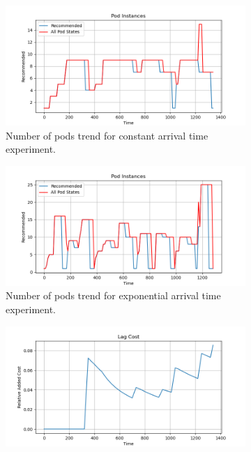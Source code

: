 \begin{figure}[H]
	\begin{subfigure}{0.49\linewidth}
	    \centering
	    \includegraphics[width=1\linewidth]{images/sliding_window/constant/pods.png}
	    \caption{Number of pods trend for constant arrival time experiment.}
	    \label{fig:sliding_window_constant_pods}
	\end{subfigure}
	\begin{subfigure}{0.49\linewidth}
	    \centering
    		\includegraphics[width=1\linewidth]{images/sliding_window/exponential/pods.png}
	    \caption{Number of pods trend for exponential arrival time experiment.}
    		\label{fig:sliding_window_exponential_pods}
	\end{subfigure}
	\begin{subfigure}{0.49\linewidth}
	    \centering
	    \includegraphics[width=1\linewidth]{images/sliding_window/constant/lag_cost_cumulative.png}

\end{subfigure}
\end{figure}
